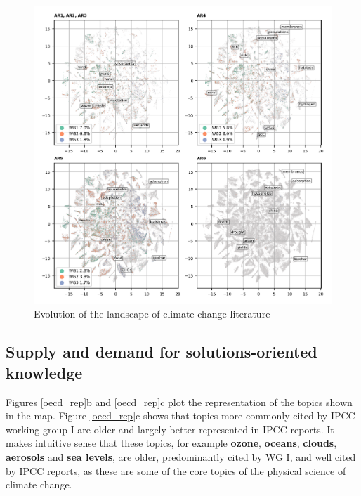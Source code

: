 \documentclass{article}
\begin{document}
\begin{linenumbers}
		
		\begin{figure}
			\begin{center}
				\includegraphics[width=180mm]{plots_pub/topic_evolution_4.png}
				\caption{Evolution of the landscape of climate change literature}
				\label{evolution-map}
			\end{center}
		\end{figure}
		
		\subsection*{Supply and demand for solutions-oriented knowledge}
		
		Figures \ref{oecd_rep}b and \ref{oecd_rep}c plot the representation of the topics shown in the map. Figure \ref{oecd_rep}c shows that topics more commonly cited by IPCC working group I are older and largely better represented in IPCC reports. It makes intuitive sense that these topics, for example \textbf{ozone}, \textbf{oceans}, \textbf{clouds}, \textbf{aerosols} and \textbf{sea levels}, are older, predominantly cited by WG I, and well cited by IPCC reports, as these are some of the core topics of the physical science of climate change.
		

\end{linenumbers}
\end{document}
